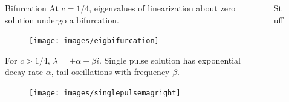 \documentclass[final]{beamer}
\newlength{\sepwid}
\newlength{\onecolwid}
\begin{document}
\begin{frame}[t]
\begin{columns}[t]
\begin{column}{\onecolwid}
    \end{column}

\begin{column}{\sepwid}\end{column}     %

    \begin{column}{\onecolwid}

      \begin{block}{Bifurcation}
      At $c = 1/4$, eigenvalues of linearization about zero solution undergo a bifurcation.
        \begin{figure}
          \begin{center}
            \texttt{[image: images/eigbifurcation]}
            \caption{}
            \label{fig:bifurcation}
          \end{center}
        \end{figure}
        For $c > 1/4$, $\lambda = \pm \alpha \pm \beta i$. Single pulse solution has exponential decay rate $\alpha$, tail oscillations with frequency $\beta$.
      \end{block} 
        \begin{figure}
          \begin{center}
            \texttt{[image: images/singlepulsemagright]}
            \caption{}
            \label{fig:singlepulsemagright}
          \end{center}
        \end{figure}

    \end{column}

\begin{column}{\sepwid}\end{column}     %

    \begin{column}{\onecolwid}

      \begin{block}{Stuff}
      \end{block} 
  

\end{column}
\end{columns}
\end{frame}
\end{document}
